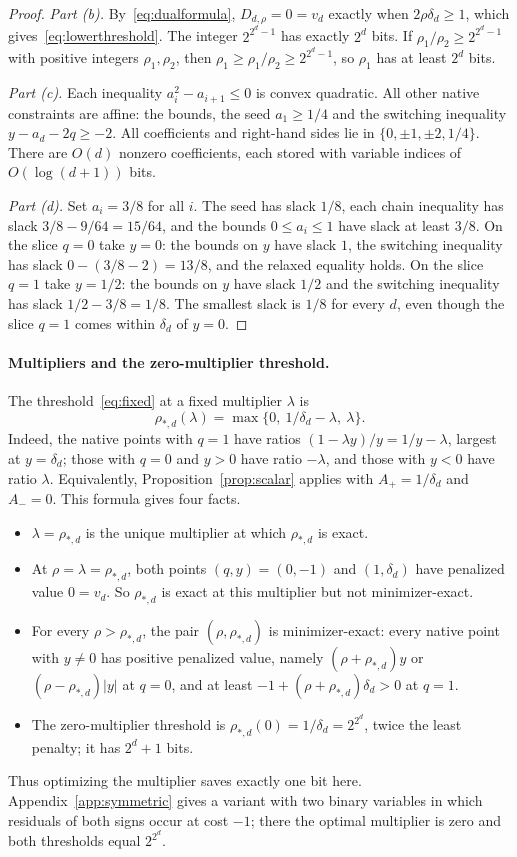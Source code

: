 \begin{proof}
\emph{Part (b).} By~\eqref{eq:dualformula}, $D_{d,\rho}=0=v_d$ exactly
when $2\rho\delta_d\ge1$, which gives~\eqref{eq:lowerthreshold}. The
integer $2^{2^d-1}$ has exactly $2^d$ bits. If
$\rho_1/\rho_2\ge2^{2^d-1}$ with positive integers $\rho_1,\rho_2$, then
$\rho_1\ge\rho_1/\rho_2\ge2^{2^d-1}$, so $\rho_1$ has at least $2^d$ bits.

\emph{Part (c).} Each inequality $a_i^2-a_{i+1}\le0$ is convex quadratic.
All other native constraints are affine: the bounds, the seed
$a_1\ge1/4$ and the switching inequality $y-a_d-2q\ge-2$. All coefficients
and right-hand sides lie in $\{0,\pm1,\pm2,1/4\}$. There are $O(d)$
nonzero coefficients, each stored with variable indices of
$O(\log(d+1))$ bits.

\emph{Part (d).} Set $a_i=3/8$ for all $i$. The seed has slack $1/8$, each
chain inequality has slack $3/8-9/64=15/64$, and the bounds
$0\le a_i\le1$ have slack at least $3/8$. On the slice $q=0$ take $y=0$:
the bounds on $y$ have slack $1$, the switching inequality has slack
$0-(3/8-2)=13/8$, and the relaxed equality holds. On the slice $q=1$ take
$y=1/2$: the bounds on $y$ have slack $1/2$ and the switching inequality
has slack $1/2-3/8=1/8$. The smallest slack is $1/8$ for every $d$, even
though the slice $q=1$ comes within $\delta_d$ of $y=0$.
\end{proof}

\paragraph{Multipliers and the zero-multiplier threshold.}
The threshold~\eqref{eq:fixed} at a fixed multiplier $\lambda$ is
\[
 \rho_{*,d}(\lambda)=\max\{0,\ 1/\delta_d-\lambda,\ \lambda\}.
\]
Indeed, the native points with $q=1$ have ratios
$(1-\lambda y)/y=1/y-\lambda$, largest at $y=\delta_d$; those with $q=0$
and $y>0$ have ratio $-\lambda$, and those with $y<0$ have ratio
$\lambda$. Equivalently, Proposition~\ref{prop:scalar} applies with
$A_+=1/\delta_d$ and $A_-=0$. This formula gives four facts.
\begin{itemize}
\item $\lambda=\rho_{*,d}$ is the unique multiplier at which $\rho_{*,d}$
is exact.
\item At $\rho=\lambda=\rho_{*,d}$, both points $(q,y)=(0,-1)$ and
$(1,\delta_d)$ have penalized value $0=v_d$. So $\rho_{*,d}$ is exact at
this multiplier but not minimizer-exact.
\item For every $\rho>\rho_{*,d}$, the pair $(\rho,\rho_{*,d})$ is
minimizer-exact: every native point with $y\ne0$ has positive penalized
value, namely $(\rho+\rho_{*,d})y$ or $(\rho-\rho_{*,d})|y|$ at $q=0$, and
at least $-1+(\rho+\rho_{*,d})\delta_d>0$ at $q=1$.
\item The zero-multiplier threshold is $\rho_{*,d}(0)=1/\delta_d=2^{2^d}$,
twice the least penalty; it has $2^d+1$ bits.
\end{itemize}
Thus optimizing the multiplier saves exactly one bit here.
Appendix~\ref{app:symmetric} gives a variant with two binary variables in
which residuals of both signs occur at cost $-1$; there the optimal
multiplier is zero and both thresholds equal $2^{2^d}$.

